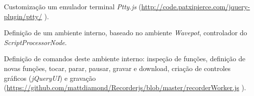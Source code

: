 \begin{inparaenum}
\item Customização um emulador terminal \emph{Ptty.js} (\footnotesize \url{http://code.patxipierce.com/jquery-plugin/ptty/} \normalsize).
\item Definição de um ambiente interno, baseado no ambiente \emph{Wavepot}, controlador do \emph{ScriptProcessorNode}.
\item Definição de comandos deste ambiente interno: inspeção de funções, definição de novas funções, tocar, parar, pausar, gravar e download, criação de controles gráficos (\emph{jQueryUI}) e gravação (\footnotesize \url{https://github.com/mattdiamond/Recorderjs/blob/master/recorderWorker.js} \normalsize).
\end{inparaenum}

